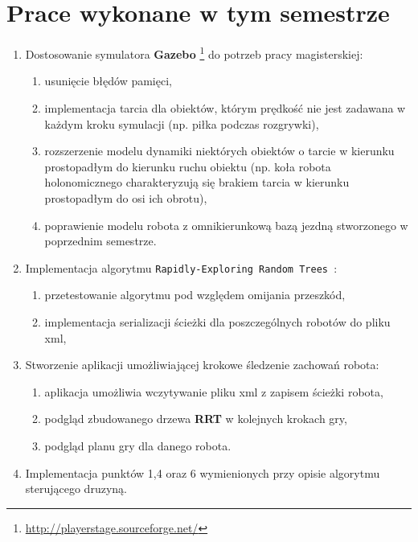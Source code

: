 \documentclass[11pt,onecolumn,a4paper,final]{article}
\begin{document}
\section*{Prace wykonane w tym semestrze}
\begin{enumerate}
 \item Dostosowanie symulatora \textbf{Gazebo} \footnote{\url{http://playerstage.sourceforge.net/}} do potrzeb pracy magisterskiej:
    \begin{enumerate}
    \item usunięcie błędów pamięci,
    \item implementacja tarcia dla obiektów, którym prędkość nie jest zadawana w każdym kroku symulacji (np. piłka podczas rozgrywki),
    \item rozszerzenie modelu dynamiki niektórych obiektów o tarcie w kierunku prostopadłym do kierunku ruchu obiektu (np. koła robota holonomicznego
    charakteryzują się brakiem tarcia w kierunku prostopadłym do osi ich obrotu),
    \item poprawienie modelu robota z omnikierunkową bazą jezdną  stworzonego w poprzednim semestrze.
    \end{enumerate}

    \item Implementacja algorytmu \texttt{Rapidly-Exploring Random Trees \cite{errt}}:
    \begin{enumerate}
     \item przetestowanie algorytmu pod względem omijania przeszkód,
     \item implementacja serializacji ścieżki dla poszczególnych robotów do pliku xml,
    \end{enumerate}
  
    \item Stworzenie aplikacji umożliwiającej krokowe śledzenie zachowań robota:
    \begin{enumerate}
    \item aplikacja umożliwia wczytywanie pliku xml z zapisem ścieżki robota,
    \item podgląd zbudowanego drzewa \textbf{RRT} w kolejnych krokach gry,
    \item podgląd planu gry dla danego robota.
    \end{enumerate}

    \item Implementacja punktów 1,4 oraz 6 wymienionych przy opisie algorytmu sterującego druzyną.
\end{enumerate}
\end{document}
